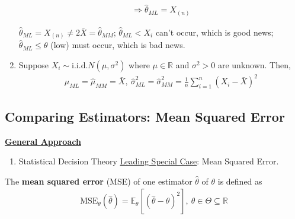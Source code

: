 \documentclass[11pt]{elegantbook}
\begin{document}
\begin{example}
\begin{enumerate}
\begin{equation}
\begin{aligned}
            \Rightarrow \hat{\theta}_{ML}=X_{(n)}
        \end{aligned}
        \nonumber
    \end{equation}
    \begin{remark}
        $\hat{\theta}_{ML}=X_{(n)}\neq 2\bar{X}=\hat{\theta}_{MM}$; $\hat{\theta}_{ML}<X_i$ can't occur, which is good news; $\hat{\theta}_{ML}\leq \theta$ (low) must occur, which is bad news.
    \end{remark}
    \item Suppose $X_i\sim \text{i.i.d.}N(\mu,\sigma^2)$ where $\mu\in \mathbb{R}$ and $\sigma^2>0$ are unknown. Then,
    \begin{equation}
        \begin{aligned}
            \hat{\mu}_{ML}=\hat{\mu}_{MM}=\bar{X},\ \hat{\sigma}^2_{ML}=\hat{\sigma}^2_{MM}=\frac{1}{n}\sum_{i=1}^n (X_i-\bar{X})^2
        \end{aligned}
        \nonumber
    \end{equation}
\end{enumerate}
\end{example}

\subsection{Comparing Estimators: Mean Squared Error}
\textbf{\underline{General Approach}}
\begin{enumerate}[$\circ$]
    \item Statistical Decision Theory
    \subitem \underline{Leading Special Case}: Mean Squared Error.
\end{enumerate}

\begin{definition}
    \normalfont
    The \textbf{mean squared error} (MSE) of one estimator $\hat{\theta}$ of $\theta$ is defined as
    \begin{equation}
        \begin{aligned}
            \text{MSE}_\theta(\hat{\theta})=\mathbb{E}_\theta[(\hat{\theta}-\theta)^2],\ \theta\in \Theta\subseteq \mathbb{R}
        \end{aligned}
        \nonumber
    \end{equation}
\end{definition}
\end{document}
